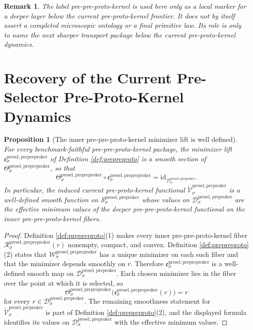 \documentclass[11pt]{article}
\newcommand{\PreProtoKernelSpace}[1]{\mathcal S_{#1}^{\mathrm{presel,preproker}}}
\newcommand{\PreProtoKernelBody}[1]{\mathcal D_{#1}^{\mathrm{presel,preproker}}}
\newcommand{\PrePreProtoKernelProj}[1]{\Theta_{#1}^{\mathrm{presel,prepreproker}}}
\newcommand{\PrePreProtoKernelFiber}[2]{\mathcal R_{#1}^{\mathrm{presel,prepreproker}}(#2)}
\newcommand{\PrePreProtoKernelFunctional}[1]{\mathscr W_{#1}^{\mathrm{presel,prepreproker}}}
\newcommand{\PrePreProtoKernelMinLift}[1]{\mathfrak e_{#1}^{\mathrm{presel,prepreproker}}}
\newcommand{\InducedPreProtoKernelFunctional}[1]{\widetilde{\mathscr V}_{#1}^{\mathrm{presel,preproker}}}
\newtheorem{proposition}{Proposition}
\newtheorem{remark}{Remark}
\begin{document}
\begin{remark}
The label \emph{pre-pre-proto-kernel} is used here only as a local marker for a deeper layer below the current pre-proto-kernel frontier. It does not by itself assert a completed microscopic ontology or a final primitive law. Its role is only to name the next sharper transport package below the current pre-proto-kernel dynamics.
\end{remark}

\section{Recovery of the Current Pre-Selector Pre-Proto-Kernel Dynamics}

\begin{proposition}[The inner pre-pre-proto-kernel minimizer lift is well defined]
\label{prop:inner}
For every benchmark-faithful pre-pre-proto-kernel package, the minimizer lift \(\PrePreProtoKernelMinLift{\sigma}\) of Definition \ref{def:prepreproto} is a smooth section of \(\PrePreProtoKernelProj{\sigma}\), so that
\[
\PrePreProtoKernelProj{\sigma}\circ\PrePreProtoKernelMinLift{\sigma}
=
\mathrm{id}_{\PreProtoKernelBody{\sigma}}.
\]
In particular, the induced current pre-proto-kernel functional \(\InducedPreProtoKernelFunctional{\sigma}\) is a well-defined smooth function on \(\PreProtoKernelSpace{\sigma}\) whose values on \(\PreProtoKernelBody{\sigma}\) are the effective minimum values of the deeper pre-pre-proto-kernel functional on the inner pre-pre-proto-kernel fibers.
\end{proposition}

\begin{proof}
Definition \ref{def:prepreproto}(1) makes every inner pre-pre-proto-kernel fiber \(\PrePreProtoKernelFiber{\sigma}{r}\) nonempty, compact, and convex. Definition \ref{def:prepreproto}(2) states that \(\PrePreProtoKernelFunctional{\sigma}\) has a unique minimizer on each such fiber and that the minimizer depends smoothly on \(r\). Therefore \(\PrePreProtoKernelMinLift{\sigma}\) is a well-defined smooth map on \(\PreProtoKernelBody{\sigma}\). Each chosen minimizer lies in the fiber over the point at which it is selected, so
\[
\PrePreProtoKernelProj{\sigma}\bigl(\PrePreProtoKernelMinLift{\sigma}(r)\bigr)=r
\]
for every \(r\in\PreProtoKernelBody{\sigma}\). The remaining smoothness statement for \(\InducedPreProtoKernelFunctional{\sigma}\) is part of Definition \ref{def:prepreproto}(2), and the displayed formula identifies its values on \(\PreProtoKernelBody{\sigma}\) with the effective minimum values.
\end{proof}
\end{document}
